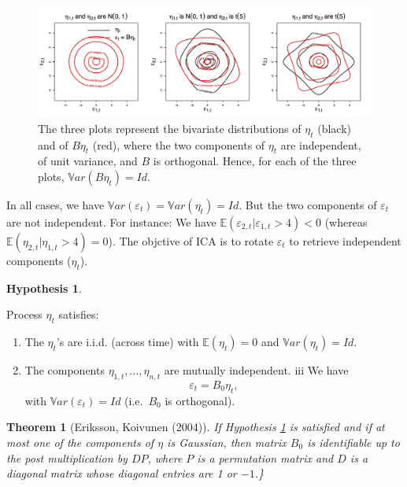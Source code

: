 \documentclass[
  12pt,
]{book}
\providecommand{\tightlist}{%
  \setlength{\itemsep}{0pt}\setlength{\parskip}{0pt}}
\newtheorem{theorem}{Theorem}[chapter]
\theoremstyle{definition}
\theoremstyle{definition}
\theoremstyle{definition}
\theoremstyle{definition}
\newtheorem{hypothesis}{Hypothesis}[chapter]
\theoremstyle{remark}
\begin{document}
\begin{figure}
\includegraphics[width=0.95\linewidth]{images/Figure_E} \caption{The three plots represent the bivariate distributions of $\eta_t$ (black) and of $B\eta_t$ (red), where the two components of $\eta_t$ are independent, of unit variance, and $B$ is orthogonal. Hence, for each of the three plots, $\mathbb{V}ar(B\eta_t)=Id$.}\label{fig:ThreePlots}
\end{figure}

In all cases, we have \(\mathbb{V}ar(\varepsilon_t)=\mathbb{V}ar(\eta_t)=Id\). But the two components of \(\varepsilon_t\) are not independent. For instance: We have \(\mathbb{E}(\varepsilon_{2,t}|\varepsilon_{1,t}>4)<0\) (whereas \(\mathbb{E}(\eta_{2,t}|\eta_{1,t}>4)=0\)). The objctive of ICA is to rotate \(\varepsilon_t\) to retrieve independent components (\(\eta_t\)).

\begin{hypothesis}
\protect\hypertarget{hyp:NonGauss}{}\label{hyp:NonGauss}

Process \(\eta_t\) satisfies:

\begin{enumerate}
\def\labelenumi{\roman{enumi}.}
\tightlist
\item
  The \(\eta_t\)'s are i.i.d. (across time) with \(\mathbb{E}(\eta_t) = 0\) and \(\mathbb{V}ar(\eta_t) = Id.\)
\item
  The components \(\eta_{1,t}, \ldots, \eta_{n,t}\) are mutually independent.
  iii We have
  \[
  \boxed{\varepsilon_t = B_0 \eta_t,}
  \]
  with \(\mathbb{V}ar(\varepsilon_t) = Id\) (i.e.~\(B_0\) is orthogonal).
\end{enumerate}

\end{hypothesis}

\begin{theorem}[Eriksson, Koivunen (2004)]
\protect\hypertarget{thm:EK2004}{}\label{thm:EK2004}If Hypothesis \ref{hyp:NonGauss} is satisfied and if at most one of the components of \(\eta\) is Gaussian, then matrix \(B_0\) is identifiable up to the post multiplication by \(DP\), where \(P\) is a permutation matrix and \(D\) is a diagonal matrix whose diagonal entries are 1 or \(-1\).\}
\end{theorem}
\end{document}
